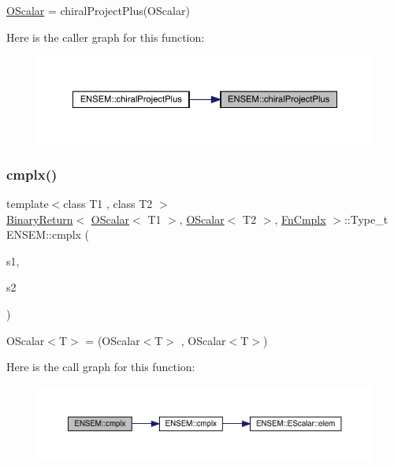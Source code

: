 \mbox{\hyperlink{classENSEM_1_1OScalar}{O\+Scalar}} = chiral\+Project\+Plus(\+O\+Scalar) 

Here is the caller graph for this function\+:\nopagebreak
\begin{figure}[H]
\begin{center}
\leavevmode
\includegraphics[width=350pt]{d1/d71/group__obsscalar_gad83dc4f2cde27e1d12f3eb6eb672bf87_icgraph}
\end{center}
\end{figure}
\mbox{\label{group__obsscalar_gabf1bc6f0ef1fc4fa374ff48fddcbe9b3}} 
\subsubsection{\texorpdfstring{cmplx()}{cmplx()}}
{\footnotesize\ttfamily template$<$class T1 , class T2 $>$ \\
\mbox{\hyperlink{structENSEM_1_1BinaryReturn}{Binary\+Return}}$<$ \mbox{\hyperlink{classENSEM_1_1OScalar}{O\+Scalar}}$<$ T1 $>$, \mbox{\hyperlink{classENSEM_1_1OScalar}{O\+Scalar}}$<$ T2 $>$, \mbox{\hyperlink{structENSEM_1_1FnCmplx}{Fn\+Cmplx}} $>$\+::Type\+\_\+t E\+N\+S\+E\+M\+::cmplx (\begin{DoxyParamCaption}\item[{const \mbox{\hyperlink{classENSEM_1_1OScalar}{O\+Scalar}}$<$ T1 $>$ \&}]{s1,  }\item[{const \mbox{\hyperlink{classENSEM_1_1OScalar}{O\+Scalar}}$<$ T2 $>$ \&}]{s2 }\end{DoxyParamCaption})\hspace{0.3cm}{\ttfamily [inline]}}



O\+Scalar$<$\+T$>$ = (O\+Scalar$<$\+T$>$ , O\+Scalar$<$\+T$>$) 

Here is the call graph for this function\+:\nopagebreak
\begin{figure}[H]
\begin{center}
\leavevmode
\includegraphics[width=350pt]{d1/d71/group__obsscalar_gabf1bc6f0ef1fc4fa374ff48fddcbe9b3_cgraph}
\end{center}
\end{figure}
\mbox{\label{group__obsscalar_gad6c32f4ab79b8017fc993162435d1d72}} 
